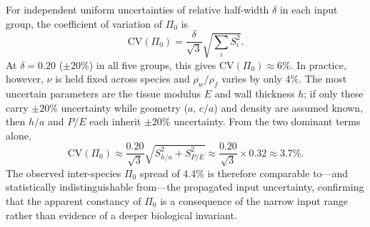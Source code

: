\documentclass[review]{elsarticle}
\begin{document}
For independent uniform uncertainties of relative half-width $\delta$ in
each input group, the coefficient of variation of $\Pi_0$ is
\begin{equation}
  \mathrm{CV}(\Pi_0) = \frac{\delta}{\sqrt{3}}
    \sqrt{\sum_i S_i^2}.
  \label{eq:cv}
\end{equation}
At $\delta = 0.20$ ($\pm 20$\%) in all five groups, this gives
$\mathrm{CV}(\Pi_0) \approx 6$\%.  In practice, however, $\nu$ is held
fixed across species and $\rho_w/\rho_f$ varies by only 4\%.
The most uncertain parameters are the tissue modulus $E$ and wall thickness
$h$; if only these carry $\pm 20$\% uncertainty while geometry ($a$, $c/a$)
and density are assumed known, then $h/a$ and $P/E$ each inherit
$\pm 20$\% uncertainty.  From the two dominant terms alone,
\begin{equation}
  \mathrm{CV}(\Pi_0) \approx \frac{0.20}{\sqrt{3}}
    \sqrt{S_{h/a}^2 + S_{P/E}^2} \approx \frac{0.20}{\sqrt{3}} \times 0.32
    \approx 3.7\%.
\end{equation}
The observed inter-species $\Pi_0$ spread of 4.4\% is therefore
comparable to---and statistically indistinguishable from---the propagated
input uncertainty, confirming that the apparent constancy of $\Pi_0$
is a consequence of the narrow input range rather than evidence of a
deeper biological invariant.
\end{document}
